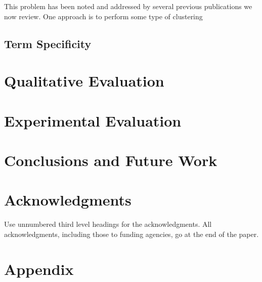 \documentclass{article} %
\begin{document}
This problem has been noted and addressed by several previous publications we now review.  One approach is to perform some type of clustering  

\subsection{Term Specificity}

\section{Qualitative Evaluation}

\section{Experimental Evaluation}

\section{Conclusions and Future Work}

\section*{Acknowledgments}

Use unnumbered third level headings for the acknowledgments. All
acknowledgments, including those to funding agencies, go at the end of the paper.




\section*{Appendix}
\end{document}
